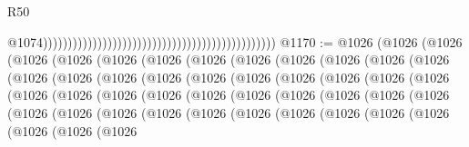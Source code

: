 \begin{lexlean}{R50}
\begin{coremodule}
{{{{{{{{{{{{{{{{{{{{{{{{{{{{{{{{{{{{{{{{{{{{{{{{{{{{{{{{{{{{                                                                                                  @1074)))))))))))))))))))))))))))))))))))))))))))))))
@1170 := @1026
    (@1026
      (@1026
        (@1026
          (@1026
            (@1026
              (@1026
                (@1026
                  (@1026
                    (@1026
                      (@1026
                        (@1026
                          (@1026
                            (@1026
                              (@1026
                                (@1026
                                  (@1026
                                    (@1026
                                      (@1026
                                        (@1026
                                          (@1026
                                            (@1026
                                              (@1026
                                                (@1026
                                                  (@1026
                                                    (@1026
                                                      (@1026
                                                        (@1026
                                                          (@1026
                                                            (@1026
                                                              (@1026
                                                                (@1026
                                                                  (@1026
                                                                    (@1026
                                                                      (@1026
                                                                        (@1026
                                                                          (@1026
                                                                            (@1026
                                                                              (@1026
                                                                                (@1026
                                                                                  (@1026
                                                                                    (@1026
                                                                                      (@1026
                                                                                        (@1026
                                                                                          (@1026
                                                                                            (@1026
}}}}}}}}}}}}}}}}}}}}}}}}}}}}}}}}}}}}}}}}}}}}}}}}}}}}}}}}}}}}
\end{coremodule}
\end{lexlean}
